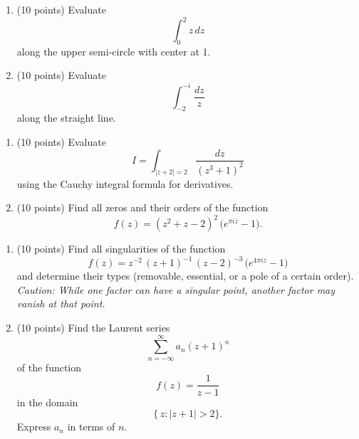 \documentclass[12pt]{article}
\theoremstyle{definition} %
\theoremstyle{plain} %
\begin{document}
\begin{enumerate}
    \item (10 points) Evaluate
    \[
    \int_{0}^{2} z \, dz
    \]
    along the upper semi-circle with center at 1.

    \item (10 points) Evaluate
    \[
    \int_{-2}^{-i} \frac{dz}{z}
    \]
    along the straight line.
\end{enumerate}

\begin{enumerate}
    \item (10 points) Evaluate
    \[
    I = \int_{|z+2|=2} \frac{dz}{(z^3 + 1)^2}
    \]
    using the Cauchy integral formula for derivatives.

    \item (10 points) Find all zeros and their orders of the function
    \[
    f(z) = (z^2 + z - 2)^2 \,\bigl(e^{\pi i z} - 1\bigr).
    \]
\end{enumerate}
\begin{enumerate}
    \item (10 points) Find all singularities of the function
    \[
    f(z) = z^{-2} \,(z+1)^{-1} \,(z-2)^{-3}\,\bigl(e^{4\pi i z} - 1\bigr)
    \]
    and determine their types (removable, essential, or a pole of a certain order). 
    \emph{Caution: While one factor can have a singular point, another factor may vanish at that point.}

    \item (10 points) Find the Laurent series
    \[
    \sum_{n=-\infty}^{\infty} a_n (z+1)^n
    \]
    of the function 
    \[
    f(z) = \frac{1}{z-1}
    \]
    in the domain 
    \[
    \{\,z : |z+1| > 2\}.
    \]
    Express $a_n$ in terms of $n$.
\end{enumerate}
\end{document}

